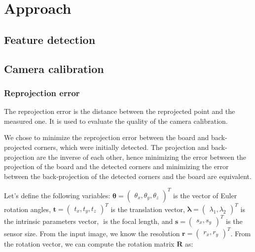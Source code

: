 \chapter{Approach}\label{cha:approach}

\section{Feature detection}\label{sec:feature_detection}


\section{Camera calibration}\label{sec:camera_calibration}

\subsection{Reprojection error}\label{sub:reprojection_error}

The reprojection error is the distance between the reprojected point and the
measured one. It is used to evaluate the quality of the camera calibration.

We chose to minimize the reprojection error between the board and back-projected
corners, which were initially detected. The projection and back-projection are
the inverse of each other, hence minimizing the error between the projection of
the board and the detected corners and minimizing the error between the
back-projection of the detected corners and the board are
equivalent.

Let's define the following variables: \(\boldsymbol{\theta} = \begin{pmatrix}
	\theta_x, \theta_y, \theta_z
\end{pmatrix}^{T}\) is the vector of Euler rotation angles, \(\mathbf{t} = \begin{pmatrix}
	t_x, t_y, t_z
\end{pmatrix}^{T}\) is the translation vector, \(\boldsymbol{\lambda} = \begin{pmatrix}
	\lambda_1, \lambda_2
\end{pmatrix}^{T}\) is the intrinsic parameters vector, \(\) is the focal
length, and \(\mathbf{s} = \begin{pmatrix}
	s_x, s_y
\end{pmatrix}^{T}\) is the sensor size.
From the input image, we know the resolution \(\mathbf{r} = \begin{pmatrix}
	r_x, r_y
\end{pmatrix}^{T}\).
From the rotation vector, we can compute the rotation matrix \(\mathbf{R}\) as:

